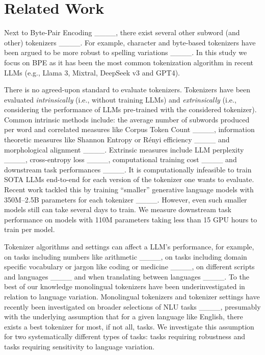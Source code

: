 \section{Related Work}
Next to Byte-Pair Encoding ____, there exist several other subword (and other) tokenizers ____. %
    For example, character and byte-based tokenizers have been argued to be more robust to spelling variations ____. In this study we focus on BPE as it has been the most common tokenization algorithm in recent LLMs (e.g., Llama 3, Mixtral, DeepSeek v3 and GPT4). 

    There is no agreed-upon standard to evaluate tokenizers. Tokenizers have been evaluated \textit{intrinsically} (i.e., without training LLMs) and \textit{extrinsically} (i.e., considering the performance of LLMs pre-trained with the considered tokenizer). Common intrinsic methods include: the average number of subwords produced per word and correlated measures like Corpus Token Count ____, %
     information theoretic measures like Shannon Entropy or Rényi efficiency ____ and
     morphological alignment ____. 
    Extrinsic measures include LLM perplexity ____, cross-entropy loss ____, computational training cost ____ and downstream task performances ____. 
    It is computationally infeasible to train SOTA LLMs end-to-end for each version of the tokenizer one wants to evaluate. Recent work tackled this by training ``smaller'' generative language models  with 350M--2.5B parameters for each tokenizer ____. However, even such smaller models still can take several days to train. 
    We measure downstream task performance on models with 110M parameters taking less than 15 GPU hours to train per model. %

    Tokenizer algorithms and settings can affect a LLM's performance, for example,
    on tasks including numbers like arithmetic ____,
    on tasks including domain specific vocabulary or jargon like coding or medicine ____,
    on different scripts and languages ____
    and when translating between languages ____.
    To the best of our knowledge monolingual tokenizers have been underinvestigated in relation to language variation. Monolingual tokenizers and tokenizer settings have recently been investigated on broader selections of NLU tasks ____, presumably with the underlying assumption that for a given language like English, there exists a best tokenizer for most, if not all, tasks. We investigate this assumption for two systematically different types of tasks: tasks requiring robustness and tasks requiring sensitivity to language variation.